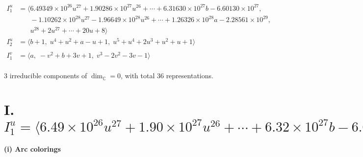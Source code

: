 \documentclass[1p]{elsarticle_modified}
\theoremstyle{definition}
\begin{document}
\begin{align*}
I^u_{1}&=\langle 
6.49349\times10^{26} u^{27}+1.90286\times10^{27} u^{26}+\cdots+6.31630\times10^{27} b-6.60130\times10^{27},\\
\phantom{I^u_{1}}&\phantom{= \langle  }-1.10262\times10^{28} u^{27}-1.96649\times10^{28} u^{26}+\cdots+1.26326\times10^{28} a-2.28561\times10^{29},\\
\phantom{I^u_{1}}&\phantom{= \langle  }u^{28}+2 u^{27}+\cdots+20 u+8\rangle \\
I^u_{2}&=\langle 
b+1,\;u^4+u^2+a- u+1,\;u^5+u^4+2 u^3+u^2+u+1\rangle \\
\\
I^v_{1}&=\langle 
a,\;- v^2+b+3 v+1,\;v^3-2 v^2-3 v-1\rangle \\
\end{align*}
\raggedright * 3 irreducible components of $\dim_{\mathbb{C}}=0$, with total 36 representations.\\
\newpage
\renewcommand{\arraystretch}{1}
\centering \section*{I. $I^u_{1}= \langle 6.49\times10^{26} u^{27}+1.90\times10^{27} u^{26}+\cdots+6.32\times10^{27} b-6.60\times10^{27},\;-1.10\times10^{28} u^{27}-1.97\times10^{28} u^{26}+\cdots+1.26\times10^{28} a-2.29\times10^{29},\;u^{28}+2 u^{27}+\cdots+20 u+8 \rangle$}
\flushleft \textbf{(i) Arc colorings}\\
\end{document}
